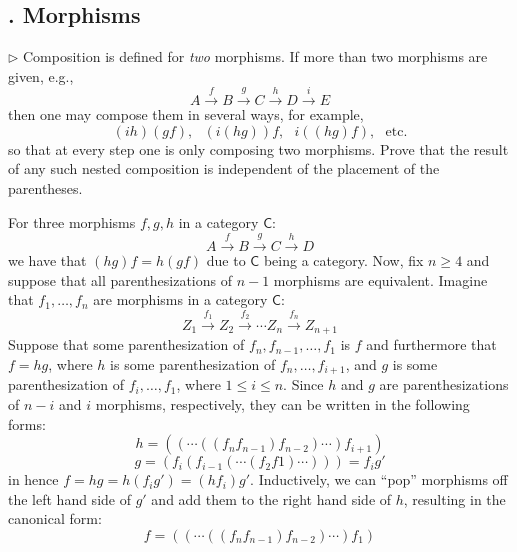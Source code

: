 \subsection{. Morphisms}
\begin{problem}[4.1]
	$\rhd$ Composition is defined for \textit{two} morphisms. If more than two
	morphisms are given, e.g.,
	\[ A \xrightarrow{f} B \xrightarrow{g} C \xrightarrow{h} D \xrightarrow{i} E \]
	then one may compose them in several ways, for example,
	\[ (ih)(gf),\,\,\,\,(i(hg))f,\,\,\,\,i((hg)f),\,\,\,\,\text{etc.}\]
	so that at every step one is only composing two morphisms. Prove that the result
	of any such nested composition is independent of the placement of the
	parentheses.
\end{problem}
\begin{solution}
	For three morphisms $f,g,h$ in a category $\mathsf{C}$:
	\[ A \xrightarrow{f} B \xrightarrow{g} C \xrightarrow{h} D \]
	we have that $(hg)f = h(gf)$ due to $\mathsf{C}$ being a category. Now, fix $n\geq 4$
	and suppose that all parenthesizations of $n-1$ morphisms are equivalent.
	Imagine that $f_1, \dots, f_n$ are morphisms in a category $\mathsf{C}$:
	\[ Z_1 \xrightarrow{f_1} Z_2 \xrightarrow{f_2} \cdots Z_n \xrightarrow{f_n}
	Z_{n+1} \]
	Suppose that some parenthesization of $f_n, f_{n-1}, \dots, f_1$ is $f$ and
	furthermore that $f=hg$, where $h$ is some parenthesization of $f_n, \dots,
	f_{i+1}$, and $g$ is some parenthesization of $f_i, \dots, f_1$, where $1\leq
	i\leq n$. Since $h$ and $g$ are parenthesizations of $n-i$ and $i$ morphisms,
	respectively, they can be written in the following forms:
	\[ h = ((\cdots((f_nf_{n-1})f_{n-2})\cdots)f_{i+1}) \]
	\[ g = (f_i(f_{i-1}(\cdots(f_2f1)\cdots))) = f_ig' \]
	in hence $f=hg=h(f_ig')=(hf_i)g'$. Inductively, we can ``pop'' morphisms off the
	left hand side of $g'$ and add them to the right hand side of $h$, resulting in
	the canonical form:
	\[ f = ((\cdots((f_nf_{n-1})f_{n-2})\cdots)f_1) \]
\end{solution}

